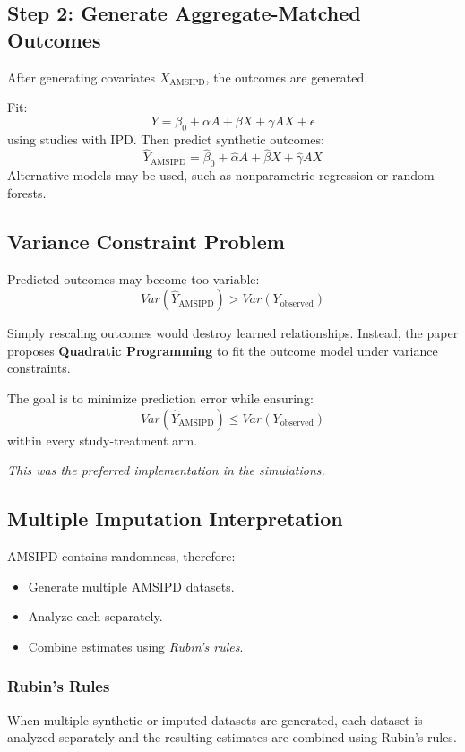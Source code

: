 \documentclass[11pt]{article}
\begin{document}
\subsection*{Step 2: Generate Aggregate-Matched Outcomes}

After generating covariates $X_{\text{AMSIPD}}$, the outcomes are generated.

Fit:\[Y=\beta_0+\alpha A+\beta X+\gamma AX+\epsilon\] using studies with IPD. Then predict synthetic outcomes:
\[\hat Y_{\text{AMSIPD}}=\hat\beta_0+\hat\alpha A+\hat\beta X+\hat\gamma AX\]
Alternative models may be used, such as nonparametric regression or random forests.

\subsection*{Variance Constraint Problem}

Predicted outcomes may become too variable:\[Var(\hat Y_{\text{AMSIPD}})>Var(Y_{\text{observed}})\]

Simply rescaling outcomes would destroy learned relationships. Instead, the paper proposes \textbf{Quadratic Programming} to fit the outcome model under variance constraints.

The goal is to minimize prediction error while ensuring:\[Var(\hat Y_{\text{AMSIPD}})\le Var(Y_{\text{observed}})\] within every study-treatment arm.

\emph{This was the preferred implementation in the simulations.}

\subsection*{Multiple Imputation Interpretation}

AMSIPD contains randomness, therefore:
\begin{itemize}
    \item Generate multiple AMSIPD datasets.
    \item Analyze each separately.
    \item Combine estimates using \emph{Rubin's rules}.
\end{itemize}

\subsubsection*{Rubin's Rules}

When multiple synthetic or imputed datasets are generated, each dataset is analyzed separately and the resulting estimates are combined using Rubin's rules.
\end{document}

